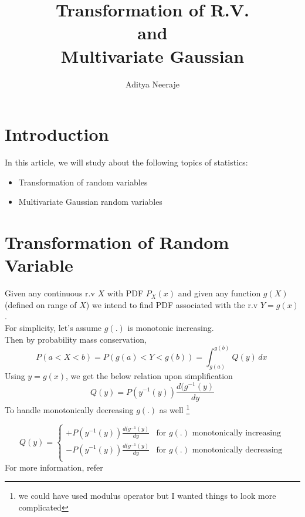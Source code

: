 \documentclass{article}
\title{Transformation of R.V. \\ and \\ Multivariate Gaussian}
\author{Aditya Neeraje}
\date{}
\begin{document}
\pagestyle{fancy}
\maketitle


\tableofcontents
\clearpage

\section{Introduction}
In this article, we will study about the following topics of statistics:
\begin{itemize}
    \item Transformation of random variables
    \item Multivariate Gaussian random variables
\end{itemize}

\section{Transformation of Random Variable}
Given any continuous r.v $X$ with PDF $P_{X}(x)$ and given any function $g(X)$ (defined on range of $X$) we intend to find PDF associated with the r.v $Y = g(x)$.\\
For simplicity, let's assume $g(.)$ is monotonic increasing.\\
Then by probability mass conservation,
\[
    P(a < X < b) = P(g(a) < Y < g(b)) = \int_{g(a)}^{g(b)}Q(y) \,dx\
\]
Using $y=g(x)$, we get the below relation upon simplification
\[
    Q(y) = P(y^{-1}(y))\frac{d(g^{-1}(y)}{dy}
\]
To handle monotonically decreasing $g(.)$ as well
\footnote{\label{foot:ref_1}we could have used modulus operator but I wanted things to look more complicated}

\begin{equation}
    Q(y) = 
    \begin{cases}
        +P(y^{-1}(y))\frac{d(g^{-1}(y)}{dy} & \text{for } g(.) \text{ monotonically increasing}\\
        -P(y^{-1}(y))\frac{d(g^{-1}(y)}{dy} & \text{for } g(.) \text{ monotonically decreasing}\\
    \end{cases}
\end{equation}
For more information, refer \cite{url:transformations}
\end{document}
